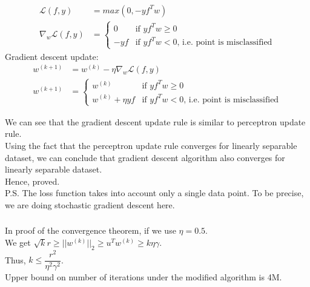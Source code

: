 \documentclass[12pt, fleqn]{article}
\begin{document}
\subsubsection{}
\begin{equation*}
  \begin{aligned}
    \mathcal{L}(f, y)          & = max(0, -y f^T w) \\
    \nabla_w \mathcal{L}(f, y) & =
    \begin{cases}
      0    & \text{if $y f^T w \ge 0$}                            \\
      -y f & \text{if $y f^T w < 0$, i.e. point is misclassified}
    \end{cases}
  \end{aligned}
\end{equation*}
Gradient descent update:
\begin{equation*}
  \begin{aligned}
    w^{(k+1)} & = w^{(k)} - \eta \nabla_w \mathcal{L}(f, y) \\
    w^{(k+1)} & =
    \begin{cases}
      w^{(k)}            & \text{if $y f^T w \ge 0$}                            \\
      w^{(k)} + \eta y f & \text{if $y f^T w < 0$, i.e. point is misclassified}
    \end{cases}
  \end{aligned}
\end{equation*}

We can see that the gradient descent update rule is similar to perceptron update rule. \\
Using the fact that the perceptron update rule converges for linearly separable dataset, we can conclude that gradient descent algorithm also converges for linearly separable dataset. \\
Hence, proved. \\

P.S. The loss function takes into account only a single data point. To be precise, we are doing stochastic gradient descent here.

\subsubsection{}
In proof of the convergence theorem, if we use $\eta = 0.5$. \\
We get $\sqrt{k} r \ge ||w^{(k)}||_2 \ge u^T w^{(k)} \ge k \eta \gamma$. \\
Thus, $k \le \dfrac{r^2}{\eta^2 \gamma^2}$. \\
Upper bound on number of iterations under the modified algorithm is 4M. \\
\end{document}
